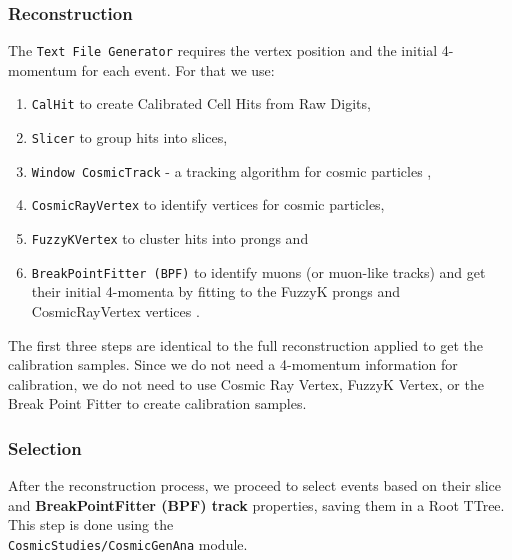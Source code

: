\documentclass[12pt]{article}
\begin{document}
\subsubsection{Reconstruction}
The \texttt{Text File Generator} requires the vertex position and the initial 4-momentum for each event. For that we use:
\begin{enumerate}
\item \texttt{CalHit} to create Calibrated Cell Hits from Raw Digits,
\item \texttt{Slicer} to group hits into slices,
\item \texttt{Window CosmicTrack} - a tracking algorithm for cosmic particles \cite{NOVA-doc-15977-v1},
\item \texttt{CosmicRayVertex} to identify vertices for cosmic particles,
\item \texttt{FuzzyKVertex} to cluster hits into prongs and
\item \texttt{BreakPointFitter (BPF)} to identify muons (or muon-like tracks) and get their initial 4-momenta by fitting to the FuzzyK prongs and CosmicRayVertex vertices \cite{NOVA-doc-32455-v1}.
\end{enumerate}
The first three steps are identical to the full reconstruction applied to get the calibration samples. Since we do not need a 4-momentum information for calibration, we do not need to use Cosmic Ray Vertex, FuzzyK Vertex, or the Break Point Fitter to create calibration samples.

\subsubsection{Selection}\label{secSelection}
After the reconstruction process, we proceed to select events based on their slice and \textbf{BreakPointFitter (BPF) track} properties, saving them in a Root TTree. This step is done using the\\ \texttt{CosmicStudies/CosmicGenAna} module.
\end{document}

